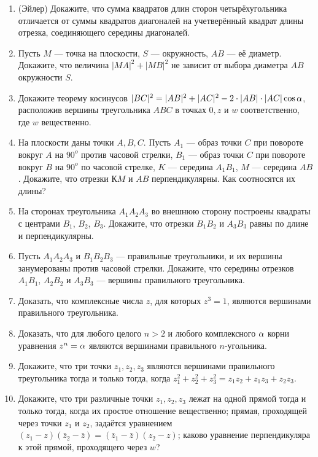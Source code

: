 \begin{enumerate}
\item (Эйлер) Докажите, что сумма квадратов длин сторон четырёхугольника отличается от суммы 
квадратов диагоналей на учетверённый квадрат длины отрезка, соединяющего середины диагоналей.
\item Пусть $M$ --- точка на плоскости, $S$ --- окружность, $AB$ --- её диаметр. Докажите, что величина
$|MA|^2 + |MB|^2$ не зависит от выбора диаметра $AB$ окружности $S$.
\item Докажите теорему косинусов $|BC|^2 = |AB|^2 +|AC|^2 -2\cdot |AB|\cdot |AC|\cos\alpha$, расположив вершины треугольника $ABC$ в точках $0, z$ и $w$ соответственно, где $w$ вещественно.
\item На плоскости даны точки $A, B, C$. Пусть $A_1$ --- образ точки $C$ при повороте вокруг $A$ на $90^o$ против
часовой стрелки, $B_1$ --- образ точки $C$ при повороте вокруг $B$ на $90^o$ по часовой стрелке, $K$ --- середина $A_1B_1$, $M$ --- середина $AB$. Докажите, что отрезки $КM$ и $AB$ перпендикулярны. Как соотносятся их длины?
\item На сторонах треугольника $A_1A_2A_3$ во внешнюю сторону построены квадраты с центрами $B_1$, $B_2$, $B_3$.
Докажите, что отрезки $B_1B_2$ и $A_3B_3$ равны по длине и перпендикулярны.
\item Пусть $A_1A_2A_3$ и $B_1B_2B_3$ --- правильные треугольники, и их вершины занумерованы против часовой
стрелки. Докажите, что середины отрезков $A_1B_1$, $A_2B_2$ и $A_3B_3$ --- вершины правильного треугольника.
\item Доказать, что комплексные числа $z$, для которых $z^3 = 1$,
являются вершинами правильного треугольника.
\item Доказать, что для любого целого $n > 2$ и любого комплексного
 $\alpha$ корни уравнения $z^n = \alpha$ являются вершинами правильного $n$-угольника.
\item Докажите, что три точки $z_1, z_2, z_3$ являются вершинами правильного треугольника тогда и только
тогда, когда $z_1^2 + z_2^2 + z_3^2 = z_1 z_2 + z_1 z_3 + z_2z_3$.
\item Докажите, что \ipunkt три различные точки $z_1, z_2, z_3$ лежат на одной прямой тогда и только тогда,
когда их простое отношение вещественно; \ipunkt прямая, проходящей через точки $z_1$ и $z_2$, задаётся уравнением
$(z_1 - z)(\bar z_2 - \bar z) = (\bar z_1 - \bar z)(z_2 - z)$; \ipunkt каково уравнение перпендикуляра к этой прямой, проходящего через $w$?


\end{enumerate}
